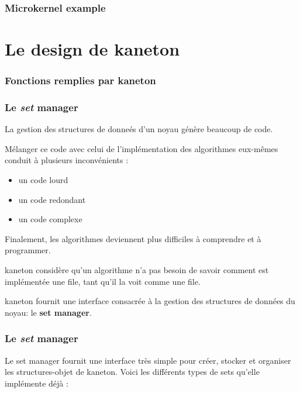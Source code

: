 
\begin{frame}
  \frametitle{Microkernel example}

  \begin{center}
  \end{center}
\end{frame}


%
%

\section{Le design de kaneton}


\begin{frame}
  \frametitle{Fonctions remplies par kaneton}

\end{frame}

\begin{frame}
  \frametitle{Le \emph{set} manager}

La gestion des structures de donne\'es d'un noyau g\'en\`ere beaucoup de code.

M\'elanger ce code avec celui de l'impl\'ementation des algorithmes eux-m\^emes
conduit \`a plusieurs inconv\'enients :

  \begin{itemize}
    \item un code lourd
    \item un code redondant
    \item un code complexe
  \end{itemize}

  \-

  Finalement, les algorithmes deviennent plus difficiles \`a comprendre et \`a
  programmer.

  \-

  kaneton consid\`ere qu'un algorithme n'a pas besoin de savoir comment est
  impl\'ement\'ee une file, tant qu'il la voit comme une file.

  \-

  kaneton fournit une interface consacr\'ee \`a la gestion des structures de
  donn\'ees du noyau: le {\bf set manager}.

\end{frame}


\begin{frame}
  \frametitle{Le \emph{set} manager}

  Le set manager fournit une interface tr\`es simple pour cr\'eer, stocker et
  organiser les structures-objet de kaneton. Voici les diff\'erents types de
  sets qu'elle impl\'emente d\'ej\`a :

\end{frame}

